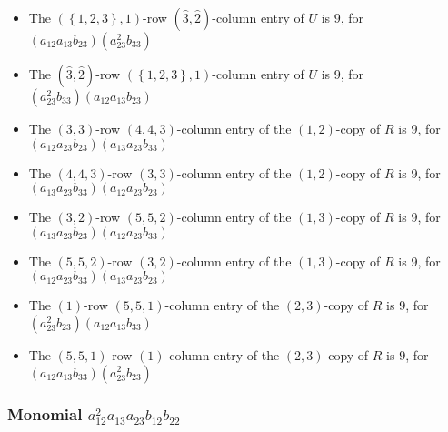 \documentclass{article}
\begin{document}
\begin{itemize}
\item The $ \left(\left\{1, 2, 3\right\}, 1\right) $-row $ (\hat{3}, \hat{2}) $-column entry of $U$ is $ 9 $, for $( a_{12} a_{13} b_{23} )( a_{23}^{2} b_{33} )$ 
\item The $(\hat{3}, \hat{2})$-row $ \left(\left\{1, 2, 3\right\}, 1\right) $-column entry of $U$ is $ 9 $, for $( a_{23}^{2} b_{33} )( a_{12} a_{13} b_{23} )$ 
\item The $(3, 3)$-row $(4, 4, 3)$-column entry of the $ \left(1, 2\right) $-copy of $R$ is $ 9 $, for $( a_{12} a_{23} b_{23} )( a_{13} a_{23} b_{33} )$ 
\item The $(4, 4, 3)$-row $(3, 3)$-column entry of the $ \left(1, 2\right) $-copy of $R$ is $ 9 $, for $( a_{13} a_{23} b_{33} )( a_{12} a_{23} b_{23} )$ 
\item The $(3, 2)$-row $(5, 5, 2)$-column entry of the $ \left(1, 3\right) $-copy of $R$ is $ 9 $, for $( a_{13} a_{23} b_{23} )( a_{12} a_{23} b_{33} )$ 
\item The $(5, 5, 2)$-row $(3, 2)$-column entry of the $ \left(1, 3\right) $-copy of $R$ is $ 9 $, for $( a_{12} a_{23} b_{33} )( a_{13} a_{23} b_{23} )$ 
\item The $(1)$-row $(5, 5, 1)$-column entry of the $ \left(2, 3\right) $-copy of $R$ is $ 9 $, for $( a_{23}^{2} b_{23} )( a_{12} a_{13} b_{33} )$ 
\item The $(5, 5, 1)$-row $(1)$-column entry of the $ \left(2, 3\right) $-copy of $R$ is $ 9 $, for $( a_{12} a_{13} b_{33} )( a_{23}^{2} b_{23} )$ 
\end{itemize}
\subsubsection{Monomial $ a_{12}^{2} a_{13} a_{23} b_{12} b_{22} $}
\end{document}

